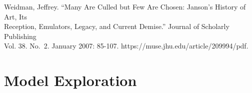 \documentclass[
  letterpaper,
  DIV=11,
  numbers=noendperiod]{scrreprt}
\begin{document}
Weidman, Jeffrey. ``Many Are Culled but Few Are Chosen: Janson's History
of Art, Its\\
Reception, Emulators, Legacy, and Current Demise.'' Journal of Scholarly
Publishing\\
Vol. 38. No.~2. January 2007: 85-107.
https://muse.jhu.edu/article/209994/pdf.

\hypertarget{model-exploration}{%
\chapter{Model Exploration}\label{model-exploration}}
\end{document}
